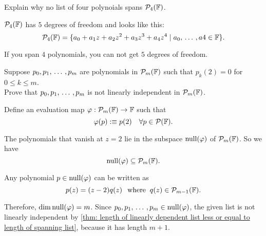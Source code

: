 \setcounter{xrcscount}{15}
\begin{xrcs}
  Explain why no list of four polynoials spans $\mathcal{P}_4(\mathbb{F})$.

  \begin{xsol}
    $\mathcal{P}_4(\mathbb{F})$ has $5$ degrees of freedom and looks like this:
    \[
      \mathcal{P}_4(\mathbb{F}) = \{a_0 + a_1 z + a_2z^2 + a_3 z^3 + a_4 z^4 \mid a_0, {\, \ldots \,\,}, a4 \in \mathbb{F} \}.
    \]

    If you span $4$ polynomials, you can not get $5$ degrees of freedom.
  \end{xsol}
\end{xrcs}

\setcounter{xrcscount}{19}
\begin{xrcs}
  Suppose $p_0, p_1, {\, \ldots \,\,}, p_m$ are polynomials in $\mathcal{P}_m(\mathbb{F})$ such that $p_k(2) = 0$ for $0\leq k \leq m$. \\
  Prove that $p_0, p_1, {\, \ldots \,\,}, p_m$ is not linearly independent in $\mathcal{P}_m(\mathbb{F})$.

  \begin{xprf}
    Define an evaluation map $\varphi : \mathcal{P}_m(\mathbb{F}) \to \mathbb{F}$ such that
    \[
    \varphi(p) :\equiv p(2) \quad \forall p \in \mathcal{P}(\mathbb{F}).
    \]

    The polynomials that vanish at $z=2$ lie in the subspace $\operatorname{null}(\varphi)$ of $\mathcal{P}_m(\mathbb{F})$. So  we have
    \[
    \operatorname{null}(\varphi) \subseteq \mathcal{P}_m(\mathbb{F}).
    \]

    Any polynomial $p \in \operatorname{null}(\varphi)$ can be written as
    \[
    p(z) = (z-2) q(z) \;\;\, \text{where}\;\; q(z) \in \mathcal{P}_{m-1} (\mathbb{F}).
    \]

    Therefore, $\operatorname{dim} \operatorname{null}(\varphi) = m$. Since $p_0, p_1, {\, \ldots \,\,}, p_m \in \operatorname{null}(\varphi)$, the given list is not linearly independent by \ref{thm: length of linearly dependent list less or equal to length of spanning list}, because it has length $m+1$.
  \end{xprf}

\end{xrcs}

